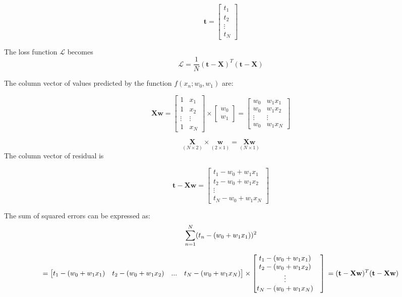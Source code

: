 \documentclass[
]{book}
\begin{document}
\[
\mathbf{t} = 
\begin{bmatrix}
t_{1} \\
t_{2} \\
\vdots \\
t_{N}
\end{bmatrix}
\]

The loss function \(\mathcal{L}\) becomes \[
\mathcal{L} = 
\frac{1}{N}(\mathbf{t} -\mathbf{X})^T(\mathbf{t} -\mathbf{X})
\]

The column vector of values predicted by the function \(f(x_n; w_0, w_1)\)
are:

\[\mathbf{Xw} = 
\begin{bmatrix}
1 & x_{1} \\
1 & x_{2} \\
\vdots & \vdots \\
1 & x_{N}
\end{bmatrix}
\times
\begin{bmatrix}
  w_0 \\ w_1
\end{bmatrix} =
\begin{bmatrix}
  w_0 & w_1x_1 \\
  w_0 & w_1x_2 \\
  \vdots & \vdots \\
  w_0 & w_1x_N 
 \end{bmatrix}
\]

\[
\underset{(N \times 2)}{\mathbf{X}} \times \underset{(2 \times 1)}{\mathbf{w}} =
    \underset{(N \times 1)}{\mathbf{Xw}}
\] The column vector of residual is

\[
\mathbf{t} - \mathbf{Xw} = 
\begin{bmatrix}
  t_1 - w_0 + w_1x_1 \\
  t_2 - w_0 + w_1x_2 \\
  \vdots \\
  t_N - w_0 + w_1x_N 
 \end{bmatrix}
\]

The sum of squared errors can be expressed as:
\[\sum_{n=1}^{N} (t_n - (w_0 + w_1x_1))^2 \\\]

\[ =
\begin{bmatrix}
  t_1 - (w_0 + w_1x_1) &
  t_2 - (w_0 + w_1x_2) &
  ... &
  t_N - (w_0 + w_1x_N )
\end{bmatrix} 
 \times
\begin{bmatrix}
  t_1 - (w_0 + w_1x_1) & \\
  t_2 - (w_0 + w_1x_2) & \\
  \vdots \\
  t_N - (w_0 + w_1x_N )
\end{bmatrix} \\
= (\mathbf{t} - \mathbf{Xw})^T(\mathbf{t} - \mathbf{Xw})\]
\end{document}
